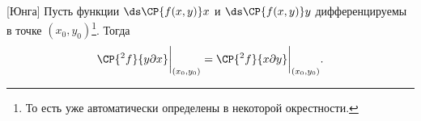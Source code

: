 [Юнга]\label{Ung}
	 Пусть функции $\ds\CP{f(x,y)}x$ и $\ds\CP{f(x,y)}y$ дифференцируемы в точке $(x_0,y_0)$\footnote{То есть уже автоматически определены в некоторой окрестности.}.
	 Тогда \[\CP{^2f}{y\partial x}\bigg|_{(x_0,y_0)} = \CP{^2f}{x\partial y}\bigg|_{(x_0,y_0)}.\]
	 